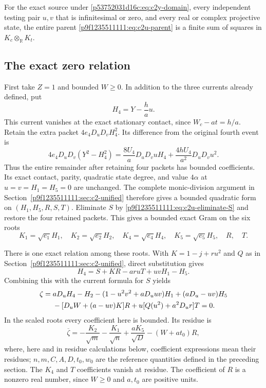 \begin{theorem}
\label{p53752031d16c:thm:c2-y-current}
For the exact source under \eqref{p53752031d16c:eq:c2y-domain}, every independent
testing pair $u,v$ that is infinitesimal or zero, and every real or
complex projective state, the entire parent \eqref{p9f1235511111:eq:c2u-parent} is a
finite sum of squares in $K_c\otimes_{\mathbb R}K_t$.
\end{theorem}

\subsection{The exact zero relation}
First take $Z=1$ and bounded $W\geq0$.  In addition to the three currents
already defined, put
\[
H_4=Y-\frac ha u.
\]
This current vanishes at the exact stationary contact, since
$W_c-at=h/a$.  Retain the extra packet $4e_4D_uD_vH_4^2$.
Its difference from the original fourth event is
\[
4e_4D_uD_v(Y^2-H_4^2)
=\frac{8U_4}{a}D_uD_vuH_4+
\frac{4hU_4}{a^2}D_uD_vu^2.
\]
Thus the entire remainder after retaining four packets has bounded
coefficients.  Its exact contact, parity, quadratic state degree, and
value $4\alpha$ at $u=v=H_1=H_5=0$ are unchanged.  The complete
monic-division argument in Section~\ref{p9f1235511111:sec:c2-unified} therefore gives
a bounded quadratic form on $(H_1,H_5,R,S,T)$.  Eliminate $S$ by
\eqref{p9f1235511111:eq:c2u-eliminate-S} and restore the four retained packets.  This
gives a bounded exact Gram on the six roots
\begin{equation}
K_1=\sqrt{e_1}H_1,\quad K_2=\sqrt{e_2}H_2,\quad
K_4=\sqrt{e_4}H_4,\quad K_5=\sqrt{e_5}H_5,\quad R,\quad T.
\label{p53752031d16c:eq:c2y-roots}
\end{equation}

There is one exact relation among these roots.  With
$K=1-j+ru^2$ and $Q$ as in Section~\ref{p9f1235511111:sec:c2-unified}, direct
substitution gives
\[
H_4=S+KR-ar uT+uvH_1-H_5.
\]
Combining this with the current formula for $S$ yields
\begin{align}
\zeta={}&aD_uH_4-H_2-(1-u^2v^2+aD_uuv)H_1
 +(aD_u-uv)H_5\notag\\
&-[D_uW+(a-uv)K]R+u[Q(u^2)+a^2D_ur]T=0.
\label{p53752031d16c:eq:c2y-zero-relation}
\end{align}
In the scaled roots every coefficient here is bounded.  Its residue is
\begin{equation}
\overline\zeta=-\frac{K_2}{\sqrt m}-\frac{K_1}{\sqrt n}
+\frac{aK_5}{\sqrt D}-(W+at_0)R,
\label{p53752031d16c:eq:c2y-zero-residue}
\end{equation}
where, here and in residue calculations below, coefficient expressions
mean their residues; $n,m,C,A,D,t_0,w_0$ are the reference quantities
defined in the preceding section.  The $K_4$ and $T$ coefficients
vanish at residue.  The coefficient of $R$ is a nonzero real number,
since $W\geq0$ and $a,t_0$ are positive units.

